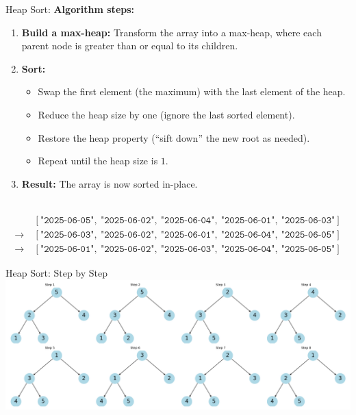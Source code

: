 \documentclass[aspectratio=169]{beamer}
\begin{document}
\begin{frame}{Heap Sort:}
  \textbf{Algorithm steps:}
  \begin{enumerate}
    \item \textbf{Build a max-heap:}
      Transform the array into a max-heap, where each parent node is greater than or equal to its children.
    \item \textbf{Sort:}
      \begin{itemize}
        \item Swap the first element (the maximum) with the last element of the heap.
        \item Reduce the heap size by one (ignore the last sorted element).
        \item Restore the heap property (“sift down” the new root as needed).
        \item Repeat until the heap size is $1$.
      \end{itemize}
    \item \textbf{Result:} The array is now sorted in-place.
  \end{enumerate}\\

  \[
  \begin{aligned}
    &[\texttt{"2025-06-05"},\ \texttt{"2025-06-02"},\ \texttt{"2025-06-04"},\ \texttt{"2025-06-01"},\ \texttt{"2025-06-03"}]\\
    \to\ &[ \texttt{"2025-06-03"},\ \texttt{"2025-06-02"},\ \texttt{"2025-06-01"},\ \texttt{"2025-06-04"},\ \texttt{"2025-06-05"}]\\
    \to\ &[ \texttt{"2025-06-01"},\ \texttt{"2025-06-02"},\ \texttt{"2025-06-03"},\ \texttt{"2025-06-04"},\ \texttt{"2025-06-05"}]
  \end{aligned}
\]
\end{frame}

\begin{frame}{Heap Sort: Step by Step}
\includegraphics[width=1.1\linewidth]{graphs/heap_sort_comics.png}
\end{frame}
\end{document}

